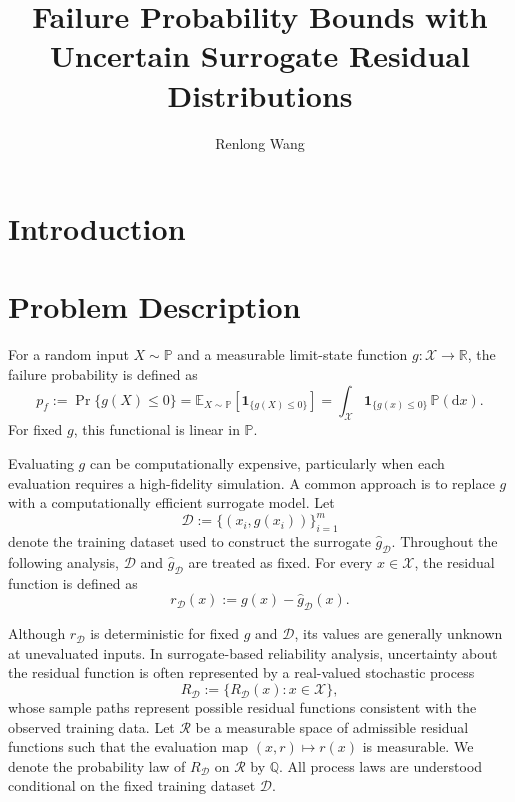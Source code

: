 \documentclass[review,11pt,3p,authoryear,nopreprintline]{elsarticle}
\begin{document}
\begin{frontmatter}
\title{Failure Probability Bounds with Uncertain Surrogate Residual Distributions}

\author[inst1]{Renlong Wang}

\begin{abstract}
\end{abstract}

\begin{keyword}
\end{keyword}
\end{frontmatter}

\section{Introduction}

\section{Problem Description}
\label{sec-problem}

For a random input $X\sim\mathbb{P}$ and a measurable limit-state function $g:\mathcal{X}\to\mathbb{R}$, the failure probability is defined as
\[
  p_f
  := \Pr\{g(X)\leq 0\}
  = \mathbb{E}_{X\sim\mathbb{P}} \left[\mathbf{1}_{\{g(X)\leq 0\}}\right]
  = \int_{\mathcal{X}}
    \mathbf{1}_{\{g(x)\leq 0\}}\,\mathbb{P}(\mathrm{d}x).
\]
For fixed $g$, this functional is linear in $\mathbb{P}$.

Evaluating $g$ can be computationally expensive, particularly when each evaluation requires a high-fidelity simulation. A common approach is to replace $g$ with a computationally
efficient surrogate model. Let
\[
  \mathcal{D}
  := \{(x_i,g(x_i))\}_{i=1}^{m}
\]
denote the training dataset used to construct the surrogate $\hat{g}_{\mathcal{D}}$. Throughout the following analysis, $\mathcal{D}$ and $\hat{g}_{\mathcal{D}}$ are treated as fixed. For every $x\in\mathcal{X}$, the residual function is defined as
\[
  r_{\mathcal{D}}(x)
  := g(x)-\hat{g}_{\mathcal{D}}(x) .
\]

Although $r_{\mathcal{D}}$ is deterministic for fixed $g$ and $\mathcal{D}$, its values are generally unknown at unevaluated inputs. In surrogate-based reliability analysis, uncertainty about the residual function is often represented by a real-valued stochastic process
\[
  R_{\mathcal{D}}
  := \{R_{\mathcal{D}}(x):x\in\mathcal{X}\},
\]
whose sample paths represent possible residual functions consistent with the observed training data. Let $\mathcal{R}$ be a measurable space of admissible residual functions such that the evaluation map $(x,r)\mapsto r(x)$ is measurable. We denote the probability law of $R_{\mathcal{D}}$ on $\mathcal{R}$ by $\mathbb{Q}$. All process laws are understood conditional on the fixed training dataset $\mathcal{D}$.
\end{document}
